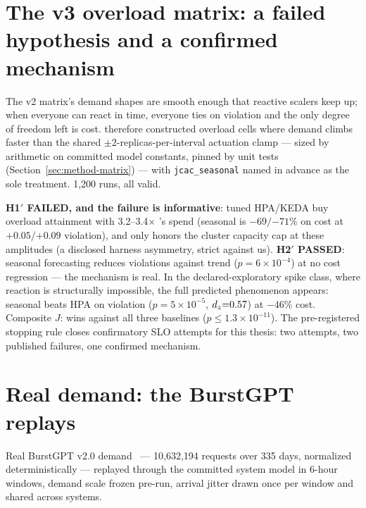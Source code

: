 \section{The v3 overload matrix: a failed hypothesis and a confirmed
mechanism}
\label{sec:eval-v3}

The v2 matrix's demand shapes are smooth enough that reactive scalers keep
up; when everyone can react in time, everyone ties on violation and the
only degree of freedom left is cost.  therefore
constructed overload cells where demand climbs faster than the shared
$\pm2$-replicas-per-interval actuation clamp --- sized by arithmetic on
committed model constants, pinned by unit tests
(Section~\ref{sec:method-matrix}) --- with \texttt{jcac\_seasonal} named in
advance as the sole treatment. 1{,}200 runs, all valid.

\textbf{H1$'$ FAILED, and the failure is informative}: tuned HPA/KEDA buy
overload attainment with 3.2--3.4$\times$ \polyforge{}'s spend (seasonal is
$-69/{-71}\%$ on cost at $+0.05/{+0.09}$ violation), and only \polyforge{}
honors the cluster capacity cap at these amplitudes (a disclosed harness
asymmetry, strict against us). \textbf{H2$'$ PASSED}: seasonal forecasting
reduces violations against trend ($p=6{\times}10^{-4}$) at no cost
regression --- the mechanism is real. In the declared-exploratory spike
class, where reaction is structurally impossible, the full predicted
phenomenon appears: seasonal beats HPA on violation
($p=5{\times}10^{-5}$, $d_z{=}0.57$) at $-46\%$ cost. Composite $J$: wins
against all three baselines ($p \le 1.3{\times}10^{-11}$). The
pre-registered stopping rule closes confirmatory SLO attempts for this
thesis: two attempts, two published failures, one confirmed mechanism.

\section{Real demand: the BurstGPT replays}
\label{sec:eval-replay}

Real BurstGPT v2.0 demand~\citep{burstgpt2024} --- 10{,}632{,}194 requests
over 335 days, normalized deterministically --- replayed through the
committed system model in 6-hour windows, demand scale frozen pre-run,
arrival jitter drawn once per window and shared across systems.


